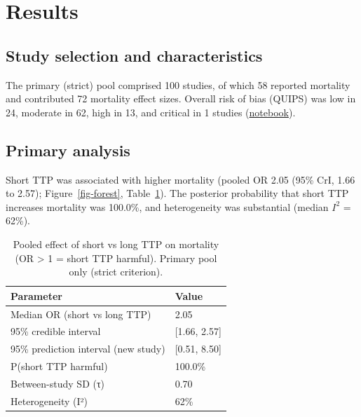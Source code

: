 \documentclass[
  11pt,
]{article}
\begin{document}
\section{Results}\label{results}

\subsection{Study selection and
characteristics}\label{study-selection-and-characteristics}

The primary (strict) pool comprised 100 studies, of which 58 reported
mortality and contributed 72 mortality effect sizes. Overall risk of
bias (QUIPS) was low in 24, moderate in 62, high in 13, and critical in
1 studies (\href{notebooks/rob.qmd}{notebook}).

\subsection{Primary analysis}\label{primary-analysis}

Short TTP was associated with higher mortality (pooled OR 2.05 (95\%
CrI, 1.66 to 2.57); Figure~\ref{fig-forest}, Table~\ref{tbl-overall}).
The posterior probability that short TTP increases mortality was
100.0\%, and heterogeneity was substantial (median \(I^2\) = 62\%).

{

\begin{longtable}[]{@{}ll@{}}

\caption{\label{tbl-overall}Pooled effect of short vs long TTP on
mortality (OR \textgreater{} 1 = short TTP harmful). Primary pool only
(strict criterion).}

\tabularnewline

\toprule\noalign{}
Parameter & Value \\
\midrule\noalign{}
\endhead
\bottomrule\noalign{}
\endlastfoot
Median OR (short vs long TTP) & 2.05 \\
95\% credible interval & {[}1.66, 2.57{]} \\
95\% prediction interval (new study) & {[}0.51, 8.50{]} \\
P(short TTP harmful) & 100.0\% \\
Between-study SD (τ) & 0.70 \\
Heterogeneity (I²) & 62\% \\

\end{longtable}

}
\end{document}
